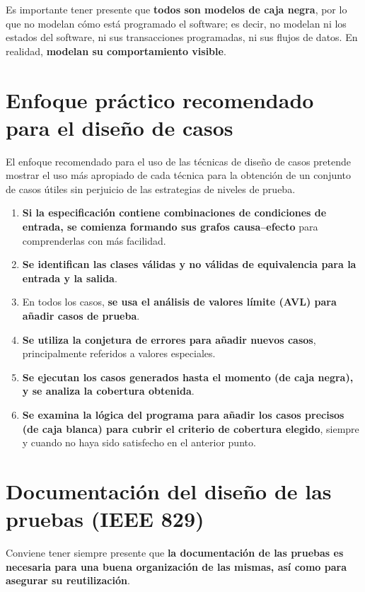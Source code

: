 Es importante tener presente que \textbf{todos son modelos de caja negra}, por lo que no modelan cómo está programado el software; es decir, no modelan ni los estados del software, ni sus transacciones programadas, ni sus flujos de datos. En realidad, \textbf{modelan su comportamiento visible}.


\section{Enfoque práctico recomendado para el diseño de casos}

El enfoque recomendado para el uso de las técnicas de diseño de casos pretende mostrar el uso más apropiado de cada técnica para la obtención de un conjunto de casos útiles sin perjuicio de las estrategias de niveles de prueba.

\begin{enumerate}
    \item \textbf{Si la especificación contiene combinaciones de condiciones de entrada, se comienza formando sus grafos causa--efecto} para comprenderlas con más facilidad.
    \item \textbf{Se identifican las clases válidas y no válidas de equivalencia para la entrada y la salida}.
    \item En todos los casos, \textbf{se usa el análisis de valores límite (AVL) para añadir casos de prueba}.
    \item \textbf{Se utiliza la conjetura de errores para añadir nuevos casos}, principalmente referidos a valores especiales.
    \item \textbf{Se ejecutan los casos generados hasta el momento (de caja negra), y se analiza la cobertura obtenida}.
    \item \textbf{Se examina la lógica del programa para añadir los casos precisos (de caja blanca) para cubrir el criterio de cobertura elegido}, siempre y cuando no haya sido satisfecho en el anterior punto.
\end{enumerate}


\section{Documentación del diseño de las pruebas (IEEE 829)}

Conviene tener siempre presente que \textbf{la documentación de las pruebas es necesaria para una buena organización de las mismas, así como para asegurar su reutilización}.\\

